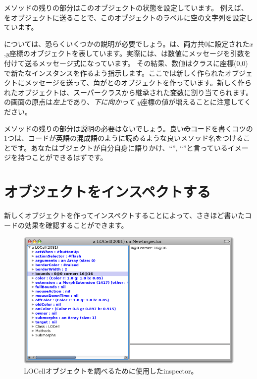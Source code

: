 \documentclass[a4paper,10pt,twoside]{book}
\begin{document}
メソッドの残りの部分はこのオブジェクトの状態を設定しています。
例えば、をオブジェクトに送ることで、このオブジェクトのラベルに空の文字列を設定しています。

については、恐らくいくつかの説明が必要でしょう。は、両方共0に設定された$x$,$y$座標のオブジェクトを表しています。実際には、は数値にメッセージを引数を付けて送るメッセージ式になっています。
その結果、数値はクラスに座標(0,0)で新たなインスタンスを作るよう指示します。ここでは新しく作られたオブジェクトにメッセージを送って、角がとのオブジェクトを作っています。新しく作られたオブジェクトは、スーパークラスから継承された変数に割り当てられます。
\pharo の画面の原点は\emph{左上}であり、\emph{下に向かって} $y$座標の値が増えることに注意してください。

メソッドの残りの部分は説明の必要はないでしょう。良い\st のコードを書くコツの1つは、コードが英語の混成語のように読めるような良いメソッド名をつけることです。あなたはブジェクトが自分自身に語りかけ、``'', ``''と言っているイメージを持つことができるはずです。

\section{オブジェクトをインスペクトする}

新しくオブジェクトを作ってインスペクトすることによって、さきほど書いたコードの効果を確認することができます。


\begin{figure}[htbp]
   \centering
   \includegraphics[width=\textwidth]{LOCellInspector} 
   \caption{LOCellオブジェクトを調べるために使用したinspector。}
\end{figure}
\end{document}
